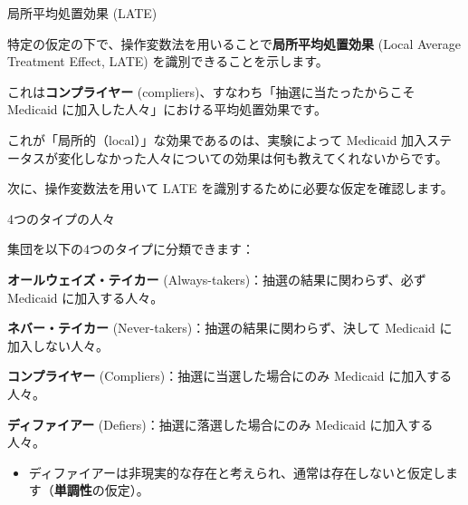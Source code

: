 \documentclass[11pt,handout]{beamer}
\newenvironment{wideitemize}{\itemize\addtolength{\itemsep}{10pt}}{\enditemize}
\begin{document}
	\begin{frame}{局所平均処置効果 (LATE)}
	
	
	\begin{wideitemize}

		\item
		特定の仮定の下で、操作変数法を用いることで\textbf{局所平均処置効果} (Local Average Treatment Effect, LATE) を識別できることを示します。
		
		\pause
		\item
		これは\textbf{コンプライヤー} (compliers)、すなわち「抽選に当たったからこそ Medicaid に加入した人々」における平均処置効果です。
		
		\pause
		\item
		これが「局所的（local）」な効果であるのは、実験によって Medicaid 加入ステータスが変化しなかった人々についての効果は何も教えてくれないからです。

		\pause
		\item
		次に、操作変数法を用いて LATE を識別するために必要な仮定を確認します。
	\end{wideitemize}
		
	\end{frame}

\begin{frame}{4つのタイプの人々}

集団を以下の4つのタイプに分類できます：
	
	\begin{wideitemize}
		\item
		\textbf{オールウェイズ・テイカー} (Always-takers)：抽選の結果に関わらず、必ず Medicaid に加入する人々。
		
		\pause
		\item  \textbf{ネバー・テイカー} (Never-takers)：抽選の結果に関わらず、決して Medicaid に加入しない人々。
		
		\pause
		\item \textbf{コンプライヤー} (Compliers)：抽選に当選した場合にのみ Medicaid に加入する人々。
		
		\pause
		\item \textbf{ディファイアー} (Defiers)：抽選に落選した場合にのみ Medicaid に加入する人々。
			\begin{itemize}
				\pause
				\item 
				ディファイアーは非現実的な存在と考えられ、通常は存在しないと仮定します（\textbf{単調性}の仮定）。
			\end{itemize}
	\end{wideitemize}

\end{frame}
\end{document}
